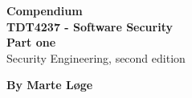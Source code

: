 \begin{titlepage}
\begin{center}

{\Huge \bf Compendium} \\[1.0cm]
{\Huge \bf TDT4237 - Software Security}\\[1.0cm]
{\Large \bf Part one} \\

{\Large Security Engineering, second edition}

\vspace{14cm}

\centering
{\Large \bf By Marte Løge}



\end{center}
\end{titlepage}